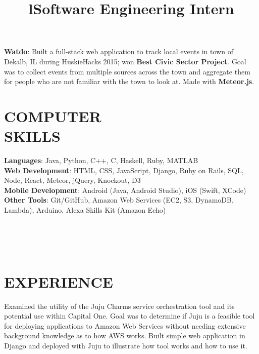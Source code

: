 \documentclass[margin]{res}
\begin{document}
\begin{resume}
\par
\textbf{Watdo}:
Built a full-stack web application to track local events in town of Dekalb, IL during
HuskieHacks 2015; won \textbf{Best Civic Sector Project}. Goal was to collect events
from multiple sources across the town and aggregate them for people who are not familiar
with the town to look at. Made with \textbf{Meteor.js}.


\section{COMPUTER\\SKILLS}

\textbf{Languages}: Java, Python, C++, C, Haskell, Ruby, MATLAB
\\
\textbf{Web Development}: HTML, CSS, JavaScript, Django, Ruby on Rails, SQL, Node,
                          React, Meteor, jQuery, Knockout, D3
\\
\textbf{Mobile Development}: Android (Java, Android Studio),
iOS (Swift, XCode)
\\
\textbf{Other Tools}: Git/GitHub, Amazon Web Services (EC2, S3, DynamoDB, Lambda),
Arduino, Alexa Skills Kit (Amazon Echo)

\begin{format}
\title{l}\\
\\
\body\\
\end{format}

\section{EXPERIENCE}
\title{\textbf{Software Engineering Intern}}
\begin{position}
Examined the utility of the Juju Charms service orchestration tool and its potential
use within Capital One. Goal was to determine if Juju is a feasible tool for deploying
applications to Amazon Web Services without needing extensive background knowledge as
to how AWS works. Built simple web application in Django and deployed with Juju to
illustrate how tool works and how to use it.
\end{position}


\end{resume}
\end{document}
